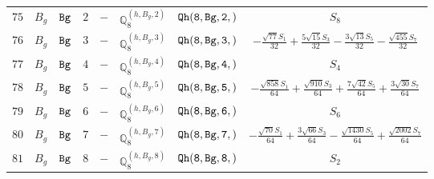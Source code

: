 \documentclass[fleqn,8pt]{jsarticle}
\begin{document}
\begin{table}[ht!]
\begin{center}
\begin{tabular}{cccccccc}
$ 75 $ & $ B_{g} $ & $ {\tt Bg} $ & $ 2 $ & $ - $ & $ \mathbb{Q}_{8}^{(h,B_{g},2)} $ & $ {\tt Qh(8,Bg,2,)} $ & $ S_{8} $ \\
$ 76 $ & $ B_{g} $ & $ {\tt Bg} $ & $ 3 $ & $ - $ & $ \mathbb{Q}_{8}^{(h,B_{g},3)} $ & $ {\tt Qh(8,Bg,3,)} $ & $ - \frac{\sqrt{77} S_{1}}{32} + \frac{5 \sqrt{15} S_{3}}{32} - \frac{3 \sqrt{13} S_{5}}{32} - \frac{\sqrt{455} S_{7}}{32} $ \\
$ 77 $ & $ B_{g} $ & $ {\tt Bg} $ & $ 4 $ & $ - $ & $ \mathbb{Q}_{8}^{(h,B_{g},4)} $ & $ {\tt Qh(8,Bg,4,)} $ & $ S_{4} $ \\
$ 78 $ & $ B_{g} $ & $ {\tt Bg} $ & $ 5 $ & $ - $ & $ \mathbb{Q}_{8}^{(h,B_{g},5)} $ & $ {\tt Qh(8,Bg,5,)} $ & $ - \frac{\sqrt{858} S_{1}}{64} + \frac{\sqrt{910} S_{3}}{64} + \frac{7 \sqrt{42} S_{5}}{64} + \frac{3 \sqrt{30} S_{7}}{64} $ \\
$ 79 $ & $ B_{g} $ & $ {\tt Bg} $ & $ 6 $ & $ - $ & $ \mathbb{Q}_{8}^{(h,B_{g},6)} $ & $ {\tt Qh(8,Bg,6,)} $ & $ S_{6} $ \\
$ 80 $ & $ B_{g} $ & $ {\tt Bg} $ & $ 7 $ & $ - $ & $ \mathbb{Q}_{8}^{(h,B_{g},7)} $ & $ {\tt Qh(8,Bg,7,)} $ & $ - \frac{\sqrt{70} S_{1}}{64} + \frac{3 \sqrt{66} S_{3}}{64} - \frac{\sqrt{1430} S_{5}}{64} + \frac{\sqrt{2002} S_{7}}{64} $ \\
$ 81 $ & $ B_{g} $ & $ {\tt Bg} $ & $ 8 $ & $ - $ & $ \mathbb{Q}_{8}^{(h,B_{g},8)} $ & $ {\tt Qh(8,Bg,8,)} $ & $ S_{2} $ \\
 \hline \hline
\end{tabular}
\end{center}
\end{table}
\end{document}

